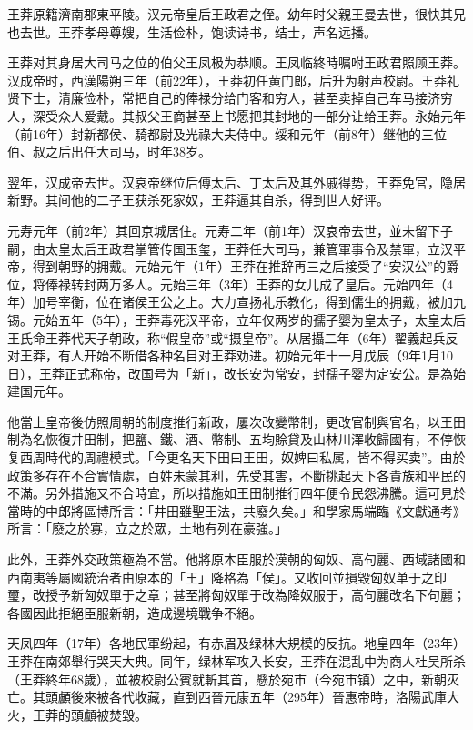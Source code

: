 王莽原籍濟南郡東平陵。汉元帝皇后王政君之侄。幼年时父親王曼去世，很快其兄也去世。王莽孝母尊嫂，生活俭朴，饱读诗书，结士，声名远播。

王莽对其身居大司马之位的伯父王凤极为恭顺。王凤临終時嘱咐王政君照顾王莽。汉成帝时，西漢陽朔三年（前22年），王莽初任黄门郎，后升为射声校尉。王莽礼贤下士，清廉俭朴，常把自己的俸禄分给门客和穷人，甚至卖掉自己车马接济穷人，深受众人爱戴。其叔父王商甚至上书愿把其封地的一部分让给王莽。永始元年（前16年）封新都侯、騎都尉及光祿大夫侍中。绥和元年（前8年）继他的三位伯、叔之后出任大司马，时年38岁。

翌年，汉成帝去世。汉哀帝继位后傅太后、丁太后及其外戚得势，王莽免官，隐居新野。其间他的二子王获杀死家奴，王莽逼其自杀，得到世人好评。

元寿元年（前2年）其回京城居住。元寿二年（前1年）汉哀帝去世，並未留下子嗣，由太皇太后王政君掌管传国玉玺，王莽任大司马，兼管軍事令及禁軍，立汉平帝，得到朝野的拥戴。元始元年（1年）王莽在推辞再三之后接受了“安汉公”的爵位，将俸禄转封两万多人。元始三年（3年）王莽的女儿成了皇后。元始四年（4年）加号宰衡，位在诸侯王公之上。大力宣扬礼乐教化，得到儒生的拥戴，被加九锡。元始五年（5年），王莽毒死汉平帝，立年仅两岁的孺子婴为皇太子，太皇太后王氏命王莽代天子朝政，称“假皇帝”或“摄皇帝”。从居攝二年（6年）翟義起兵反对王莽，有人开始不断借各种名目对王莽劝进。初始元年十一月戊辰（9年1月10日），王莽正式称帝，改国号为「新」，改长安为常安，封孺子婴为定安公。是為始建国元年。

他當上皇帝後仿照周朝的制度推行新政，屢次改變幣制，更改官制與官名，以王田制為名恢復井田制，把鹽、鐵、酒、幣制、五均賒貸及山林川澤收歸國有，不停恢复西周時代的周禮模式。「今更名天下田曰王田，奴婢曰私属，皆不得买卖”。由於政策多存在不合實情處，百姓未蒙其利，先受其害，不斷挑起天下各貴族和平民的不滿。另外措施又不合時宜，所以措施如王田制推行四年便令民怨沸騰。這可見於當時的中郎將區博所言：「井田雖聖王法，共廢久矣。」和學家馬端臨《文獻通考》所言：「廢之於寡，立之於眾，土地有列在豪強。」

此外，王莽外交政策極為不當。他將原本臣服於漢朝的匈奴、高句麗、西域諸國和西南夷等屬國統治者由原本的「王」降格為「侯」。又收回並損毀匈奴单于之印璽，改授予新匈奴單于之章；甚至將匈奴單于改為降奴服于，高句麗改名下句麗；各國因此拒絕臣服新朝，造成邊境戰争不絕。

天凤四年（17年）各地民軍纷起，有赤眉及绿林大規模的反抗。地皇四年（23年）王莽在南郊舉行哭天大典。同年，绿林军攻入长安，王莽在混乱中为商人杜吴所杀（王莽終年68歲），並被校尉公賓就斬其首，懸於宛市（今宛市镇）之中，新朝灭亡。其頭顱後來被各代收藏，直到西晉元康五年（295年）晉惠帝時，洛陽武庫大火，王莽的頭顱被焚毀。

